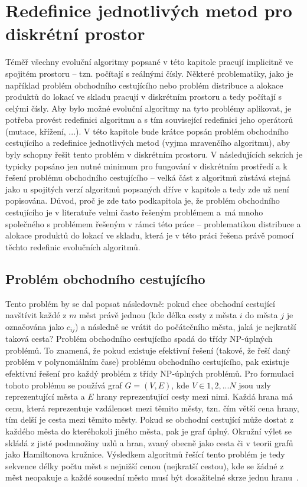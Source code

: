 \section{Redefinice jednotlivých metod pro diskrétní prostor}
\label{section:redefiniceTSP}
Téměř všechny evoluční algoritmy popsané v této kapitole pracují implicitně ve spojitém prostoru -- tzn. počítají s reálnými čísly. Některé problematiky, jako je například problém obchodního cestujícího nebo problém distribuce a alokace produktů do lokací ve skladu pracují v diskrétním prostoru a tedy počítají s celými čísly. Aby bylo možné evoluční algoritmy na tyto problémy aplikovat, je potřeba provést redefinici algoritmu a s tím související redefinici jeho operátorů (mutace, křížení, ...). V této kapitole bude krátce popsán problém obchodního cestujícího a redefinice jednotlivých metod (vyjma mravenčího algoritmu), aby byly schopny řešit tento problém v diskrétním prostoru. V následujících sekcích je typicky popsáno jen nutné minimum pro fungování v diskrétním prostředí a k řešení problému obchodního cestujícího -- velká část z algoritmů zůstává stejná jako u spojitých verzí algoritmů popsaných dříve v kapitole a tedy zde už není popisována. Důvod, proč je zde tato podkapitola je, že problém obchodního cestujícího je v literatuře velmi často řešeným problémem a~má mnoho společného s problémem řešeným v rámci této práce -- problematikou distribuce a alokace produktů do lokací ve skladu, která je v této práci řešena právě pomocí těchto redefinic evolučních algoritmů.

\subsection{Problém obchodního cestujícího}
\label{section:TSP}
Tento problém by se dal popsat následovně: pokud chce obchodní cestující navštívit každé z $m$ měst právě jednou (kde délka cesty z města $i$ do města $j$ je označována jako $c_{ij}$) a následně se vrátit do počátečního města, jaká je nejkratší taková cesta? Problém obchodního cestujícího spadá do třídy NP-úplných problémů. To znamená, že pokud existuje efektivní řešení (takové, že řeší daný problém v polynomiálním čase) problému obchodního cestujícího, pak existuje efektivní řešení pro každý problém z třídy NP-úplných problémů. Pro formulaci tohoto problému se používá graf $G = (V,E)$, kde $V \in {1,2, ... N}$ jsou uzly reprezentující města a $E$ hrany reprezentující cesty mezi nimi. Každá hrana má cenu, která reprezentuje vzdálenost mezi těmito městy, tzn. čím větší cena hrany, tím delší je cesta mezi těmito městy. Pokud se obchodní cestující může dostat z každého města do kteréhokoli jiného města, pak je graf úplný. Okružní výlet se skládá z jisté podmnožiny uzlů a hran, zvaný obecně jako cesta či v teorii grafů jako Hamiltonova kružnice. Výsledkem algoritmů řešící tento problém je tedy sekvence délky počtu měst s nejnižší cenou (nejkratší cestou), kde se žádné z měst neopakuje a každé sousední město musí být dosažitelné skrze jednu hranu~\cite{TSP, ABC_TSP}.


